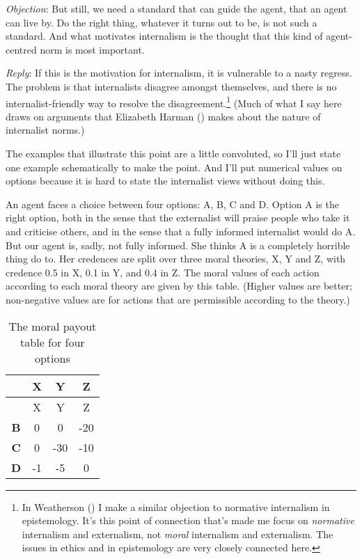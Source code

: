 \documentclass[
  10pt,
  letterpaper,
  DIV=11,
  numbers=noendperiod,
  twoside]{scrartcl}
\begin{document}
\emph{Objection}: But still, we need a standard that can guide the
agent, that an agent can live by. Do the right thing, whatever it turns
out to be, is not such a standard. And what motivates internalism is the
thought that this kind of agent-centred norm is most important.

\emph{Reply}: If this is the motivation for internalism, it is
vulnerable to a nasty regress. The problem is that internalists disagree
amongst themselves, and there is no internalist-friendly way to resolve
the disagreement.\footnote{In Weatherson
  () I make a similar objection
  to normative internalism in epistemology. It's this point of
  connection that's made me focus on \emph{normative} internalism and
  externalism, not \emph{moral} internalism and externalism. The issues
  in ethics and in epistemology are very closely connected here.} (Much
of what I say here draws on arguments that Elizabeth Harman
() makes about the nature of internalist
norms.)

The examples that illustrate this point are a little convoluted, so I'll
just state one example schematically to make the point. And I'll put
numerical values on options because it is hard to state the internalist
views without doing this.

An agent faces a choice between four options: A, B, C and D. Option A is
the right option, both in the sense that the externalist will praise
people who take it and criticise others, and in the sense that a fully
informed internalist would do A. But our agent is, sadly, not fully
informed. She thinks A is a completely horrible thing do to. Her
credences are split over three moral theories, X, Y and Z, with credence
0.5 in X, 0.1 in Y, and 0.4 in Z. The moral values of each action
according to each moral theory are given by this table. (Higher values
are better; non-negative values are for actions that are permissible
according to the theory.)

\begin{longtable}[]{@{}cccc@{}}
\caption{The moral payout table for four
options}\label{tbl-payout}\tabularnewline
\toprule\noalign{}
& X & Y & Z \\
\midrule\noalign{}
\endfirsthead
\toprule\noalign{}
& X & Y & Z \\
\midrule\noalign{}
\endhead
\bottomrule\noalign{}
\endlastfoot
\textbf{B} & 0 & 0 & -20 \\
\textbf{C} & 0 & -30 & -10 \\
\textbf{D} & -1 & -5 & 0 \\
\end{longtable}
\end{document}
